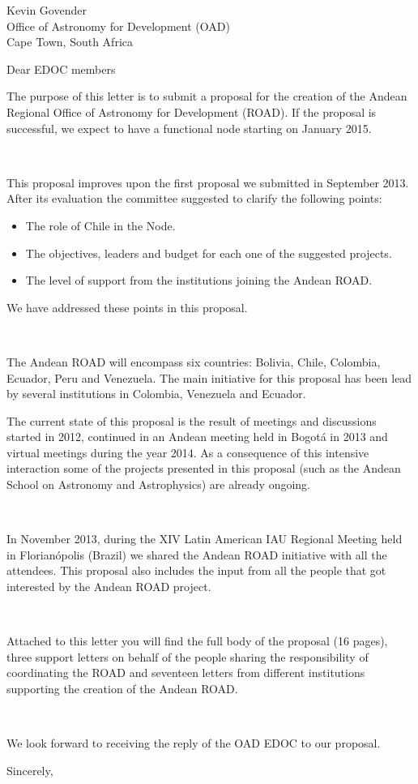 \documentclass[a4paper,DIN]{scrlttr2}
\begin{document}
\begin{letter}{%
Kevin Govender\\
Office of Astronomy for Development (OAD)\\
Cape Town, South Africa
}

\opening{Dear EDOC members}


The purpose of this letter is to submit a proposal for the creation of
the Andean Regional Office of Astronomy for Development (ROAD). If the
proposal is successful, we expect to have a functional node starting
on January 2015.

\

\noindent
This proposal improves upon the first proposal we submitted in
September 2013.  After its evaluation the committee suggested to clarify the
following points:

\begin{itemize}
\item The role of Chile in the Node. 
\item The objectives, leaders and budget for each one of the suggested
  projects.
\item The level of support from the institutions joining the
  Andean ROAD.
\end{itemize} 

\noindent
We have addressed these points in this proposal.

\

\noindent
The Andean ROAD will encompass six countries: Bolivia, Chile, Colombia,
Ecuador, Peru and Venezuela. The main initiative for this proposal has
been lead by several institutions in Colombia, Venezuela and
Ecuador. 

\noindent
The current state of this proposal is the result of meetings
and discussions started in 2012, continued in an Andean meeting held
in Bogot\'a in 2013 and virtual meetings during the year 2014. As a
consequence of this intensive interaction some of
the projects presented in this proposal (such as the Andean School on
Astronomy and Astrophysics) are already ongoing.


\

\noindent
In November 2013, during the XIV Latin American IAU Regional Meeting
held in Florian\'opolis (Brazil) we shared the Andean ROAD initiative
with all the attendees. This proposal also includes the input from all
the people that got interested by the Andean ROAD project. 

\

\noindent
Attached to this letter you will find the full body of the proposal
(16 pages), three support letters on behalf of the people sharing
the responsibility of coordinating the ROAD and seventeen letters from
different institutions supporting the creation of the Andean ROAD.

\

\noindent
We look forward to receiving the reply of the OAD EDOC 
to our proposal.


\closing{Sincerely,}

\vspace{-1cm}
\end{letter}
\end{document}
